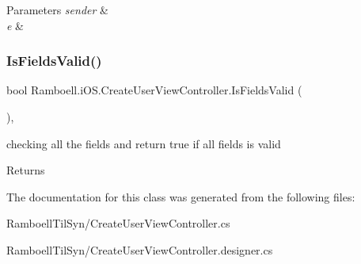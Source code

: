 \begin{DoxyParams}{Parameters}
{\em sender} & \\
\hline
{\em e} & \\
\hline
\end{DoxyParams}
\mbox{\label{class_ramboell_1_1i_o_s_1_1_create_user_view_controller_a9fb584a81661ab13e7ebbbc4b22fa43e}} 
\subsubsection{\texorpdfstring{Is\+Fields\+Valid()}{IsFieldsValid()}}
{\footnotesize\ttfamily bool Ramboell.\+i\+O\+S.\+Create\+User\+View\+Controller.\+Is\+Fields\+Valid (\begin{DoxyParamCaption}{ }\end{DoxyParamCaption})\hspace{0.3cm}{\ttfamily [inline]}, {\ttfamily [private]}}



checking all the fields and return true if all fields is valid 

\begin{DoxyReturn}{Returns}

\end{DoxyReturn}


The documentation for this class was generated from the following files\+:\begin{DoxyCompactItemize}
\item 
Ramboell\+Til\+Syn/Create\+User\+View\+Controller.\+cs\item 
Ramboell\+Til\+Syn/Create\+User\+View\+Controller.\+designer.\+cs\end{DoxyCompactItemize}
